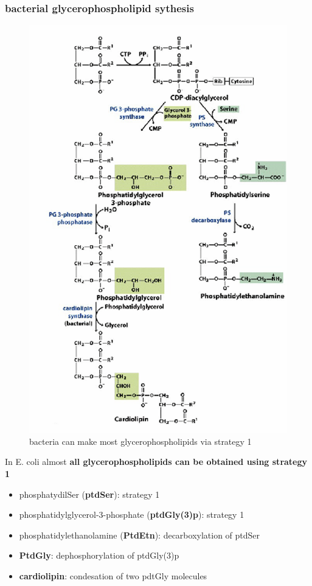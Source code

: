 \documentclass[../main.tex]{subfiles}
\begin{document}
\subsubsection{bacterial glycerophospholipid sythesis}
\begin{figure}[H]
    \centering
    \includegraphics[width=0.5\linewidth]{Sum_BC_II//lectures//bcII7+bcII8/bacteria_lipids.png}
    \caption{bacteria can make most glycerophospholipids via strategy 1}
    \label{fig:enter-label}
\end{figure}
In E. coli almost \textbf{all glycerophospholipids can be obtained using strategy 1}
\begin{itemize}
    \item phosphatydilSer (\textbf{ptdSer}): strategy 1
    \item phosphatidylglycerol-3-phosphate (\textbf{ptdGly(3)p}): strategy 1
    \item phosphatidylethanolamine (\textbf{PtdEtn}): decarboxylation of ptdSer
    \item \textbf{PtdGly}: dephosphorylation of ptdGly(3)p
    \item \textbf{cardiolipin}: condesation of two pdtGly molecules
\end{itemize}
   
\end{document}
